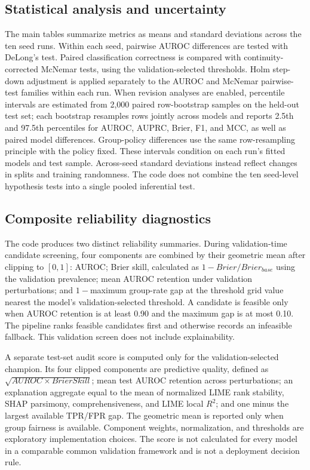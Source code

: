 \documentclass[pdflatex,sn-mathphys-num]{sn-jnl}
\begin{document}
\subsection{Statistical analysis and uncertainty}
The main tables summarize metrics as means and standard deviations across the ten seed runs. Within each seed, pairwise AUROC differences are tested with DeLong's test. Paired classification correctness is compared with continuity-corrected McNemar tests, using the validation-selected thresholds. Holm step-down adjustment is applied separately to the AUROC and McNemar pairwise-test families within each run. When revision analyses are enabled, percentile intervals are estimated from 2,000 paired row-bootstrap samples on the held-out test set; each bootstrap resamples rows jointly across models and reports 2.5th and 97.5th percentiles for AUROC, AUPRC, Brier, F1, and MCC, as well as paired model differences. Group-policy differences use the same row-resampling principle with the policy fixed. These intervals condition on each run's fitted models and test sample. Across-seed standard deviations instead reflect changes in splits and training randomness. The code does not combine the ten seed-level hypothesis tests into a single pooled inferential test.

\subsection{Composite reliability diagnostics}
The code produces two distinct reliability summaries. During validation-time candidate screening, four components are combined by their geometric mean after clipping to $[0,1]$: AUROC; Brier skill, calculated as $1-Brier/Brier_{base}$ using the validation prevalence; mean AUROC retention under validation perturbations; and $1-$maximum group-rate gap at the threshold grid value nearest the model's validation-selected threshold. A candidate is feasible only when AUROC retention is at least 0.90 and the maximum gap is at most 0.10. The pipeline ranks feasible candidates first and otherwise records an infeasible fallback. This validation screen does not include explainability.

A separate test-set audit score is computed only for the validation-selected champion. Its four clipped components are predictive quality, defined as $\sqrt{AUROC\times BrierSkill}$; mean test AUROC retention across perturbations; an explanation aggregate equal to the mean of normalized LIME rank stability, SHAP parsimony, comprehensiveness, and LIME local $R^2$; and one minus the largest available TPR/FPR gap. The geometric mean is reported only when group fairness is available. Component weights, normalization, and thresholds are exploratory implementation choices. The score is not calculated for every model in a comparable common validation framework and is not a deployment decision rule.
\end{document}

